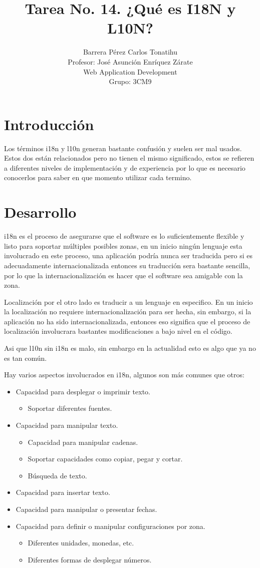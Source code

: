 \documentclass[a4paper,12pt]{article}
\title{Tarea No. 14. ¿Qué es I18N y L10N?}
\author{Barrera Pérez Carlos Tonatihu \\ Profesor: José Asunción Enríquez 
Zárate \\ Web Application Development \\ Grupo: 3CM9 }
\begin{document}
\maketitle
\newpage
\section{Introducción}
Los términos i18n y l10n generan bastante confusión y suelen ser mal usados. 
Estos dos están relacionados pero no tienen el mismo significado, estos se 
refieren a diferentes niveles de implementación y de experiencia por lo que es 
necesario conocerlos para saber en que momento utilizar cada termino.
\section{Desarrollo}
i18n es el proceso de asegurarse que el software es lo suficientemente flexible 
y listo para soportar múltiples posibles zonas, en un inicio ningún lenguaje 
esta involucrado en este proceso, una aplicación podría nunca ser traducida 
pero si es adecuadamente internacionalizada entonces su traducción sera 
bastante sencilla, por lo que la internacionalización es hacer que el software 
sea amigable con la zona.

Localización por el otro lado es traducir a un lenguaje en especifico. En un 
inicio la localización no requiere internacionalización para ser hecha, sin 
embargo, si la aplicación no ha sido internacionalizada, entonces eso significa 
que el proceso de localización involucrara bastantes modificaciones a bajo 
nivel en el código.

Asi que l10n sin i18n es malo, sin embargo en la actualidad esto es algo que ya 
no es tan común.

Hay varios aspectos involucrados en i18n, algunos son más comunes que otros:

\begin{itemize}
 \item Capacidad para desplegar o imprimir texto.
 \begin{itemize}
  \item Soportar diferentes fuentes.
 \end{itemize}
 \item Capacidad para manipular texto.
 \begin{itemize}
  \item Capacidad para manipular cadenas.
  \item Soportar capacidades como copiar, pegar y cortar.
  \item Búsqueda de texto.
 \end{itemize}
 \item Capacidad para insertar texto.
 \item Capacidad para manipular o presentar fechas.
 \item Capacidad para definir o manipular configuraciones por zona.
 \begin{itemize}
  \item Diferentes unidades, monedas, etc.
  \item Diferentes formas de desplegar números.
 \end{itemize}
\end{itemize}
\end{document}
